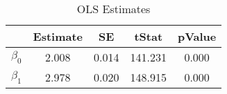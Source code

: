 \begin{table}[htb]
\centering
\caption{OLS Estimates}
\label{table:ea3:ps1:q3b:tab1}
\begin{tabular}{lcccc}
\hline
 & Estimate & SE & tStat & pValue \\
\hline\hline
$\beta_0$ & 2.008 & 0.014 & 141.231 & 0.000 \\
$\beta_1$ & 2.978 & 0.020 & 148.915 & 0.000 \\
\hline
\end{tabular}
\end{table}

